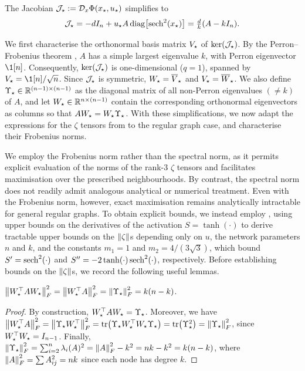 \documentclass[a4paper]{cas-dc}
\begin{document}
The Jacobian \(\mathcal{J}_{\star } := \mathcal{D}_{x}\Phi(x_{\star},u_{\star})\) simplifies to
\begin{equation}
    \J = -dI_{n}+u_{\star}A\,\mathrm{diag}\bigl[\sech^2(x_{\star})\bigr] = \tfrac{d}{k}(A-kI_{n}). \label{eq:J}
\end{equation}

We first characterise the orthonormal basis matrix \(V_{\star }\) of \(\ker(\mathcal{J}_{\star })\). By the Perron--Frobenius theorem \cite[Theorem~8.4.4]{horn2012matrix}, \(A\) has a simple largest eigenvalue \(k\), with Perron eigenvector \(\1[n]\). Consequently, \(\ker(\mathcal{J}_{\star })\) is one-dimensional (\(q=1\)), spanned by \(\V = \1[n]/\sqrt{n}\). Since \(\mathcal{J}_{\star }\) is symmetric, \(W_{\star } = \overline{V}_{\star }\) and \(V_{\star } = \overline{W}_{\star }\). We also define \(\U \in \R[(n-1)\times(n-1)]\) as the diagonal matrix of all non-Perron eigenvalues \((\neq k)\) of \(A\), and let \(\W \in \R[n\times(n-1)]\) contain the corresponding orthonormal eigenvectors as columns so that \(AW_{\star } = W_{\star }\Upsilon_{\star }\). With these simplifications, we now adapt the expressions for the \(\zeta\) tensors from  to the regular graph case, and characterise their Frobenius norms.

We employ the Frobenius norm rather than the spectral norm, as it permits explicit evaluation of the norms of the rank-3 \(\zeta\) tensors and facilitates maximisation over the prescribed neighbourhoods. By contrast, the spectral norm does not readily admit analogous analytical or numerical treatment. Even with the Frobenius norm, however, exact maximisation remains analytically intractable for general regular graphs. To obtain explicit bounds, we instead employ , using upper bounds on the derivatives of the activation \(S=\tanh(\cdot)\) to derive tractable upper bounds on the \(\norm{\zeta}\)s depending only on \(u\), the network parameters \(n\) and \(k\), and the constants \(m_1=1\) and \(m_2=4/(3\sqrt{3})\), which bound \(S'=\sech^2(\cdot)\) and \(S''=-2\tanh(\cdot)\sech^2(\cdot)\), respectively. Before establishing bounds on the \(\norm{\zeta}\)s, we record the following useful lemmas.

\begin{lemma}
    \label{lem:WAW}
    \small \(\norm{W_{\star }^{\top}AW_{\star }}^2_F = \norm{W_{\star }^{\top}A}^2_F = \norm{\Upsilon_{\star }}^2_F = k(n-k)\).
\end{lemma}
\begin{proof}
    By construction, \(W_{\star }^{\top}AW_{\star } = \Upsilon_{\star }\). Moreover, we have
    \(
    \norm{W_{\star }^\top A}_F^2
    =\norm{\Upsilon_{\star }W_{\star }^{\top}}_F^2
    =\tr(\Upsilon_{\star } W_{\star }^{\top} W_{\star } \Upsilon_{\star })
    =\tr(\Upsilon_{\star }^2)
    =\norm{\Upsilon_{\star }}_F^2
    \), since \(W_{\star }^{\top}W_{\star }=I_{n-1}\).
    Finally, \(\norm{\Upsilon_{\star }}_F^2 = \sum_{i=2}^n \lambda_i(A)^2 = \norm{A}_F^2 - k^2 = nk-k^2 = k(n-k)\), where \(\norm{A}_F^2 = \sum A_{ij}^2 = nk\) since each node has degree \(k\).
\end{proof}
\end{document}

